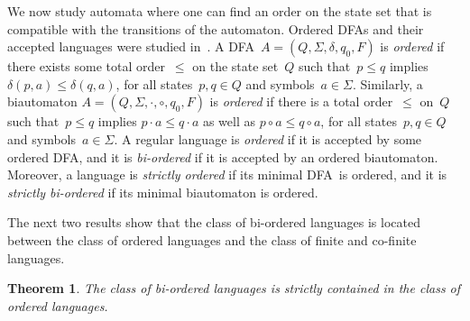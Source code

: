 \documentclass[submission]{eptcs}
\newcommand{\dfa}{\textrm{DFA}}
\newtheorem{theorem}{Theorem}
\begin{document}
We now study automata where one can find an order on the state set
that is compatible with the transitions of the automaton.  Ordered
\dfa s and their accepted languages were studied in~\cite{ShTh74}.  A
\dfa\ $A=(Q,\Sigma,\delta,q_0,F)$ is \emph{ordered} if there exists
some total order~$\leq$ on the state set~$Q$ such that~$p\leq q$
implies $\delta(p,a)\leq \delta(q,a)$, for all states~$p,q\in Q$ and
symbols~$a\in\Sigma$.  Similarly, a biautomaton
$A=(Q,\Sigma,\cdot,\circ,q_0,F)$ is \emph{ordered} if there is a total
order~$\leq$ on~$Q$ such that~$p\leq q$ implies $p\cdot a \leq q\cdot
a$ as well as $p\circ a \leq q\circ a$, for all states~$p,q\in Q$ and
symbols~$a\in\Sigma$.
A regular language is \emph{ordered} if it is accepted by some ordered
\dfa, and it is \emph{bi-ordered} if it is accepted by an ordered
biautomaton.  Moreover, a language is \emph{strictly ordered} if its
minimal \dfa\ is ordered, and it is \emph{strictly bi-ordered} if its
minimal biautomaton is ordered.

The next two results show that the class of bi-ordered languages is
located between the class of ordered languages and the class of finite
and co-finite languages.

\begin{theorem}\label{thm:bi-ordered-strictly-in-ordered}
  The class of bi-ordered languages is strictly contained in the class
  of ordered languages.  
\end{theorem}
\end{document}
